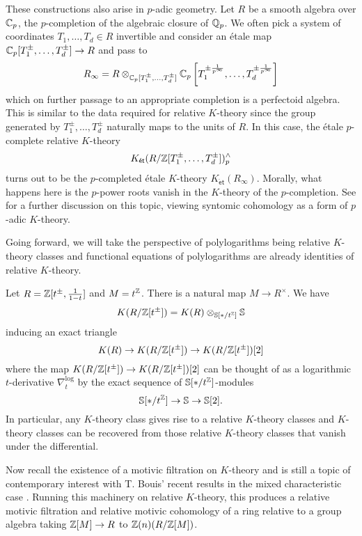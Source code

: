 These constructions also arise in $p$-adic geometry. Let $R$ be a smooth algebra over $\mathbb{C}_{p}$, the $p$-completion of the algebraic closure of $\mathbb{Q}_{p}$. We often pick a system of coordinates $T_{1},\dots,T_{d}\in R$ invertible and consider an \'{e}tale map $\mathbb{C}_{p}[T_{1}^{\pm},\dots,T_{d}^{\pm}]\to R$ and pass to
$$R_{\infty}=R\otimes_{\mathbb{C}_{p}[T_{1}^{\pm},\dots,T_{d}^{\pm}]}\mathbb{C}_{p}\left[T_{1}^{\pm\frac{1}{p^{\infty}}},\dots,T_{d}^{\pm\frac{1}{p^{\infty}}}\right]$$
which on further passage to an appropriate completion is a perfectoid algebra. This is similar to the data required for relative $K$-theory since the group generated by $T_{1}^{\pm},\dots,T_{d}^{\pm}$ naturally maps to the units of $R$. In this case, the \'{e}tale $p$-complete relative $K$-theory 
$$K_{\mathsf{\acute{e}t}}(R/\mathbb{Z}[T_{1}^{\pm},\dots,T_{d}^{\pm}])^{\wedge}_{p}$$
turns out to be the $p$-completed \'{e}tale $K$-theory $K_{\mathsf{\acute{e}t}}(R_{\infty})$. Morally, what happens here is the $p$-power roots vanish in the $K$-theory of the $p$-completion. See \cite{PrismaticCohDelta} for a further discussion on this topic, viewing syntomic cohomology as a form of $p$-adic $K$-theory. 

Going forward, we will take the perspective of polylogarithms being relative $K$-theory classes and functional equations of polylogarithms are already identities of relative $K$-theory. 

\begin{example}
    Let $R=\mathbb{Z}[t^{\pm},\frac{1}{1-t}]$ and $M=t^{\mathbb{Z}}$. There is a natural map $M\to R^{\times}$. We have 
    $$K(R/\mathbb{Z}[t^{\pm}])=K(R)\otimes_{\mathbb{S}[*/t^{\mathbb{Z}}]}\mathbb{S}$$
    inducing an exact triangle 
    $$K(R)\to K(R/\mathbb{Z}[t^{\pm}])\to K(R/\mathbb{Z}[t^{\pm}])[2]$$
    where the map $K(R/\mathbb{Z}[t^{\pm}])\to K(R/\mathbb{Z}[t^{\pm}])[2]$ can be thought of as a logarithmic $t$-derivative $\nabla^{\log}_{t}$ by the exact sequence of $\mathbb{S}[*/t^{\mathbb{Z}}]$-modules
    $$\mathbb{S}[*/t^{\mathbb{Z}}]\to\mathbb{S}\to\mathbb{S}[2].$$
    In particular, any $K$-theory class gives rise to a relative $K$-theory classes and $K$-theory classes can be recovered from those relative $K$-theory classes that vanish under the differential. 
\end{example}

Now recall the existence of a motivic filtration on $K$-theory \cite{MotivicFiltrationKTheory} and is still a topic of contemporary interest with T. Bouis' recent results in the mixed characteristic case \cite{BouisThesis}. Running this machinery on relative $K$-theory, this produces a relative motivic filtration and relative motivic cohomology of a ring relative to a group algebra taking $\mathbb{Z}[M]\to R$ to $\mathbb{Z}(n)(R/\mathbb{Z}[M])$. 

